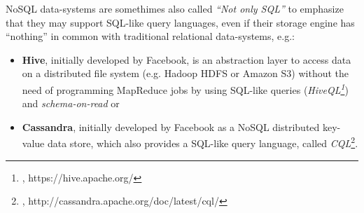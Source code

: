 {NoSQL data-systems are somethimes also called \textit{``Not only SQL''} to emphasize that they may support SQL-like query languages, even if their storage engine has ``nothing'' in common with traditional relational data-systems, e.g.:\\
\begin{samepage}
\begin{itemize}
\item \textbf{Hive}, initially developed by Facebook, is an abstraction layer to access data on a distributed file system (e.g. Hadoop HDFS or Amazon S3) without the need of programming MapReduce jobs by using SQL-like queries (\textit{HiveQL\footnote{\cite{AHW}, https://hive.apache.org/}}) and \textit{schema-on-read} or 
\item \textbf{Cassandra}, initially developed by Facebook as a NoSQL distributed key-value data store, which also provides a SQL-like query language, called \textit{CQL}\footnote{\cite{CQL}, http://cassandra.apache.org/doc/latest/cql/}.\\[0.5 cm]
\end{itemize}
\end{samepage}


}
